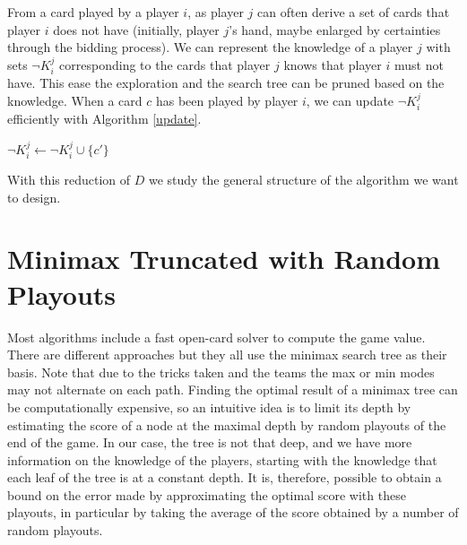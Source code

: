 \documentclass[runningheads]{llncs}
\begin{document}
From a card played by a player $i$, as player $j$ can often derive a set of 
cards that player $i$ does not have (initially, player $j$'s hand, maybe enlarged by certainties through the bidding process). We can represent the knowledge of a player $j$ with sets $\neg K^j_i$ corresponding to the cards that player $j$ knows that player $i$ must not have. This ease the exploration and the search tree can be pruned based on the knowledge.
When a card $c$ has been played by player $i$, we can update $\neg K^j_i$ efficiently with Algorithm \ref{update}.
\begin{algorithm}[t]
\caption{$\mbox{\em update}(\neg K^j_i, c, s)$}
\label{update}
\begin{algorithmic}

 \State $\neg K^j_i \gets \neg K^j_i \cup \{c'\}$
\EndIf 
\EndFor
\end{algorithmic}
\end{algorithm}
With this reduction of $D$ we study the general structure of the algorithm we want to design.


\section{Minimax Truncated with Random Playouts}
\label{annex:playouts}

Most algorithms include a fast open-card solver to compute the game value. There are different approaches but they all use the minimax search tree as their basis. Note that due to the tricks taken and the teams the max or min modes may not alternate on each path.
%
Finding the optimal result of a minimax tree can be computationally expensive, so an intuitive idea is to limit its depth by estimating the score of a node at the maximal depth by random playouts of the end of the game. In our case, the tree is not that deep, and we have more information on the knowledge of the players, starting with the knowledge that each leaf of the tree is at a constant depth. It is, therefore, possible to obtain a bound on the error made by approximating the optimal score with these playouts, in particular by taking the average of the score obtained by a number of random playouts.

\end{document}
